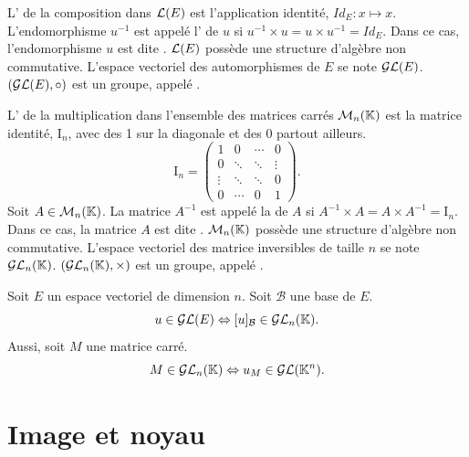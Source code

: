 \documentclass{book}
\begin{document}
\begin{Definition}
L' de la composition dans $\LE$ est l'application identité, $Id_{E}:x\mapsto x$. L'endomorphisme $u^{-1}$ est appelé l'  de $u$ si $ u^{-1}×u=u×u^{-1}=Id_{E}$. Dans ce cas, l'endomorphisme $u$ est dite .  $\LE$ possède une structure d'algèbre non commutative. L'espace vectoriel des automorphismes de $E$ se note $ \GLE$.   $(\GLE,\circ)$ est un groupe, appelé .
\end{Definition}
\begin{Definition}
L' de la multiplication dans l'ensemble des matrices carrés $\MnK$ est la matrice identité, $\mathrm {I} _{n}$, avec des 1 sur la diagonale et des 0 partout ailleurs.  
$$ \mathrm {I} _{n}=\begin{pmatrix}1&0&\cdots &0\\0&\ddots &\ddots &\vdots \\\vdots &\ddots &\ddots &0\\0&\cdots &0&1\end{pmatrix}.$$Soit $A\in\MnK$. La matrice $A^{-1}$ est appelé la  de $A$ si $ A^{-1}×A=A×A^{-1}= \mathrm {I} _{n}$. Dans ce cas, la matrice $A$ est dite .  $\MnK$ possède une structure d'algèbre non commutative. L'espace vectoriel des matrice inversibles de taille $n$ se note $\GLnK$.   $(\GLnK,\times)$ est un groupe, appelé .  
\end{Definition}
\begin{Proposition}[Dualité]
Soit $E$ un espace vectoriel de dimension $n$. Soit $\mathcal{B}$ une base de $E$.\\
$$u\in\GLE\Leftrightarrow [u]_\mathcal{B}\in \GLnK.$$
Aussi, soit $M$ une matrice carré.
$$M \in \GLnK \Leftrightarrow u_M\in \GLE[\K^n] .$$
\end{Proposition}
\section{Image et noyau}
\end{document}

